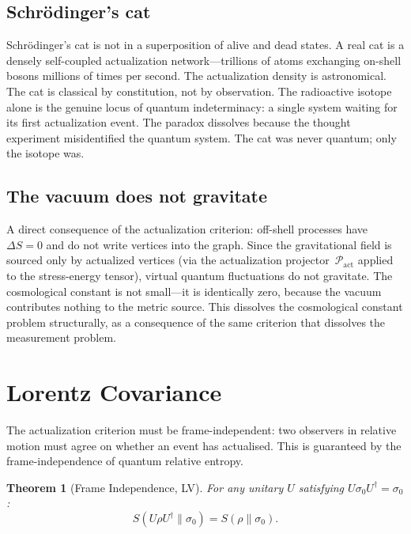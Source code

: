 \documentclass[11pt,a4paper]{article}
\theoremstyle{plain}
\newtheorem{theorem}{Theorem}[section]
\theoremstyle{definition}
\theoremstyle{remark}
\newcommand{\Pact}{\mathcal{P}_{\mathrm{act}}}
\begin{document}
\subsection{Schr\"odinger's cat}\label{sec:cat}

Schr\"odinger's cat is not in a superposition of alive and dead states.  A real cat
is a densely self-coupled actualization network---trillions of atoms exchanging
on-shell bosons millions of times per second.  The actualization density is
astronomical.  The cat is classical by constitution, not by observation.  The
radioactive isotope alone is the genuine locus of quantum indeterminacy: a single
system waiting for its first actualization event.  The paradox dissolves because the
thought experiment misidentified the quantum system.  The cat was never quantum;
only the isotope was.

\subsection{The vacuum does not gravitate}\label{sec:vacuum}

A direct consequence of the actualization criterion: off-shell processes have
$\Delta S = 0$ and do not write vertices into the graph.  Since the gravitational
field is sourced only by actualized vertices (via the actualization projector~$\Pact$
applied to the stress-energy tensor), virtual quantum fluctuations do not gravitate.
The cosmological constant is not small---it is identically zero, because the vacuum
contributes nothing to the metric source.  This dissolves the cosmological constant
problem structurally, as a consequence of the same criterion that dissolves the
measurement problem.

\section{Lorentz Covariance}\label{sec:lorentz}

The actualization criterion must be frame-independent: two observers in relative
motion must agree on whether an event has actualised.  This is guaranteed by the
frame-independence of quantum relative entropy.

\begin{theorem}[Frame Independence, LV]\label{thm:frame}
For any unitary $U$ satisfying $U\sigma_0 U^\dagger = \sigma_0$:
\begin{equation}
S(U\rho U^\dagger \| \sigma_0) = S(\rho \| \sigma_0).
\label{eq:frame}
\end{equation}
\end{theorem}
\end{document}
